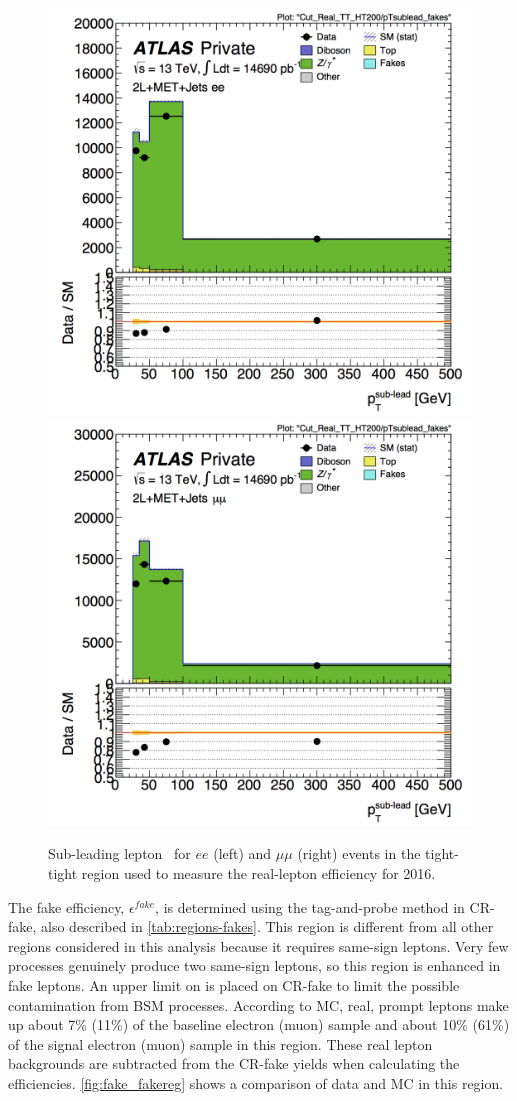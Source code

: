 \begin{centering}
\begin{figure}[bth]
\myfloatalign
\includegraphics[width=.45\linewidth]{figures/fakes/ee-Cut_Real_TT_HT200-pTsublead_fakes-lin_2016.png}
\includegraphics[width=.45\linewidth]{figures/fakes/mm-Cut_Real_TT_HT200-pTsublead_fakes-lin_2016.png}
\caption{Sub-leading lepton \pT\ for $ee$ (left) and $\mu\mu$ (right) events in the tight-tight region used to measure the real-lepton efficiency for 2016. }
\label{fig:fake_realreg}
\end{figure}
\end{centering}

The fake efficiency, $\epsilon^{fake}$, is determined using the tag-and-probe method in CR-fake, also described in \autoref{tab:regions-fakes}. This region is different from all other regions considered in this analysis because it requires same-sign leptons. Very few processes genuinely produce two same-sign leptons, so this region is enhanced in fake leptons. An upper limit on \met is placed on CR-fake to limit the possible contamination from \ac{BSM} processes. According to \ac{MC}, real, prompt leptons make up about 7\% (11\%) of the baseline electron (muon) sample and about 10\% (61\%) of the signal electron (muon) sample in this region. These real lepton backgrounds are subtracted from the CR-fake yields when calculating the efficiencies. \autoref{fig:fake_fakereg} shows a comparison of data and \ac{MC} in this region.

